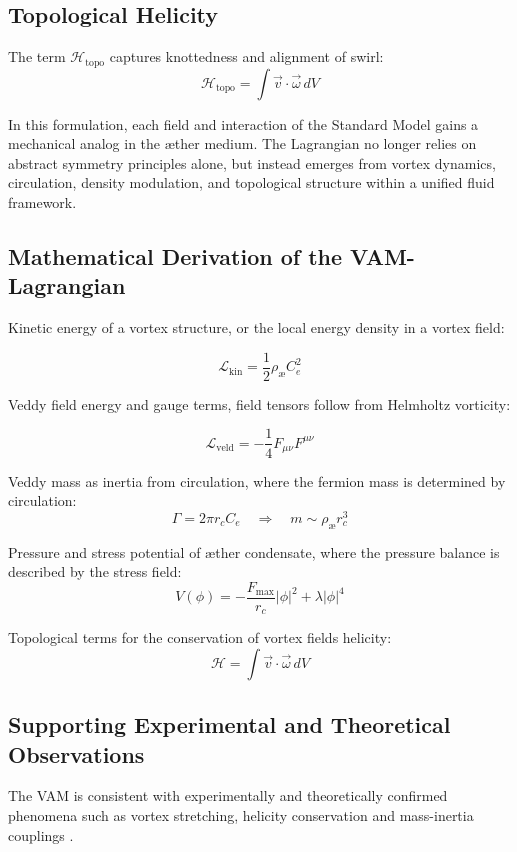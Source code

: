 \subsection{Topological Helicity}

The term $\mathcal{H}_\text{topo}$ captures knottedness and alignment of swirl:
\begin{equation}
\mathcal{H}_\text{topo} = \int \vec{v} \cdot \vec{\omega} \, dV
\end{equation}
\bigskip

In this formulation, each field and interaction of the Standard Model gains a mechanical analog in the æther medium. The Lagrangian no longer relies on abstract symmetry principles alone, but instead emerges from vortex dynamics, circulation, density modulation, and topological structure within a unified fluid framework.


\subsection*{Mathematical Derivation of the VAM-Lagrangian}

Kinetic energy of a vortex structure, or the local energy density in a vortex field:

\[
    \mathcal{L}_\text{kin} = \frac{1}{2}\rho_\text{\ae} C_e^2
\]

Veddy field energy and gauge terms, field tensors follow from Helmholtz vorticity:

\[
    \mathcal{L}_\text{veld} = -\frac{1}{4}F_{\mu\nu}F^{\mu\nu}
\]

Veddy mass as inertia from circulation, where the fermion mass is determined by circulation:
\[
    \Gamma = 2\pi r_c C_e \quad\Rightarrow\quad m \sim \rho_\text{\ae} r_c^3
\]

Pressure and stress potential of æther condensate, where the pressure balance is described by the stress field:
\[
    V(\phi) = -\frac{F_\text{max}}{r_c}|\phi|^2 + \lambda|\phi|^4
\]

Topological terms for the conservation of vortex fields helicity:
\[
    \mathcal{H} = \int \vec{v}\cdot\vec{\omega}\, dV
\]

\subsection*{Supporting Experimental and Theoretical Observations}
The VAM is consistent with experimentally and theoretically confirmed phenomena such as vortex stretching, helicity conservation and mass-inertia couplings \cite{batchelor1953,vinen2002,bewley2008,moffatt1969,kleckner2013,scheeler2014,bartlett1986}.
